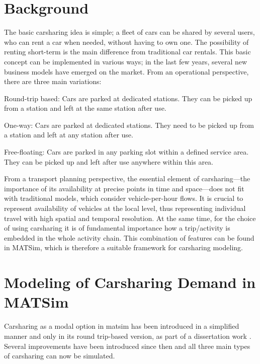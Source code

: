 \section{Background}
The basic carsharing idea is simple; a fleet of cars can be shared by several users, who can rent a car when needed, without having to own one. The possibility of renting short-term is the main difference from traditional car rentals. This basic concept can be implemented in various ways; in the last few years, several new business models have emerged on the market. From an operational perspective, there are three main variations:
%
\begin{compactitem}
	\item Round-trip based: Cars are parked at dedicated stations. They can be picked up from a station and left at the same station after use.
	\item One-way: Cars are parked at dedicated stations. They need to be picked up from a station and left at any station after use.
	\item Free-floating: Cars are parked in any parking slot within a defined service area. They can be picked up and left after use anywhere within this area. 
\end{compactitem}
%
From a transport planning perspective, the essential element  of carsharing---the importance of its availability at precise points in time and space---does not fit with traditional models, which consider vehicle-per-hour flows. It is crucial to represent availability of vehicles at the local level, thus representing individual travel with high spatial and temporal resolution. At the same time, for the choice of using carsharing it is of fundamental importance how a trip/activity is embedded in the whole activity chain. This combination of features can be found in MATSim, which is therefore a suitable framework for carsharing modeling. 

\section{Modeling of Carsharing Demand in MATSim}
Carsharing as a modal option in \gls{matsim} has been introduced in a simplified manner and only in its round trip-based version, as part of a dissertation work \citep[][]{Ciari_PhDThesis_2012}. Several improvements have been introduced since then and all three main types of carsharing can now be simulated.

